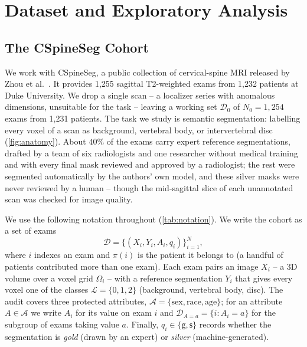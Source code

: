\section{Dataset and Exploratory Analysis}


\subsection{The CSpineSeg Cohort}

We work with CSpineSeg, a public collection of cervical-spine MRI released by
Zhou et al.~\cite{zhou2025cspineseg}. It provides 1,255 sagittal T2-weighted exams
from 1,232 patients at Duke University. We drop a single scan -- a localizer
series with anomalous dimensions, unsuitable for the task -- leaving a working set
$\mathcal{D}_0$ of $N_0 = 1{,}254$ exams from 1,231 patients. The task we study is
semantic segmentation: labelling every voxel of a scan as background, vertebral
body, or intervertebral disc (\autoref{fig:anatomy}). About $40\%$ of the exams carry expert
reference segmentations, drafted by a team of six radiologists and one researcher
without medical training and with every final mask reviewed and approved by a
radiologist; the rest were segmented automatically by the authors' own model, and
these silver masks were never reviewed by a human -- though the mid-sagittal slice of
each unannotated scan was checked for image quality.

We use the following notation throughout (\autoref{tab:notation}). We write the
cohort as a set of exams
\begin{equation}
  \mathcal{D} = \{(X_i, Y_i, A_i, q_i)\}_{i=1}^{N},
\end{equation}
where $i$ indexes an exam and $\pi(i)$ is the patient it belongs to (a handful of
patients contributed more than one exam). Each exam pairs an image $X_i$ -- a 3D
volume over a voxel grid $\Omega_i$ -- with a reference segmentation $Y_i$ that
gives every voxel one of the classes $\mathcal{L} = \{0, 1, 2\}$ (background,
vertebral body, disc). The audit covers three protected attributes,
$\mathcal{A} = \{\text{sex}, \text{race}, \text{age}\}$; for an attribute
$A \in \mathcal{A}$ we write $A_i$ for its value on exam $i$ and
$\mathcal{D}_{A=a} = \{i : A_i = a\}$ for the subgroup of exams taking value $a$.
Finally, $q_i \in \{\mathsf{g}, \mathsf{s}\}$ records whether the segmentation is
\emph{gold} (drawn by an expert) or \emph{silver} (machine-generated).

